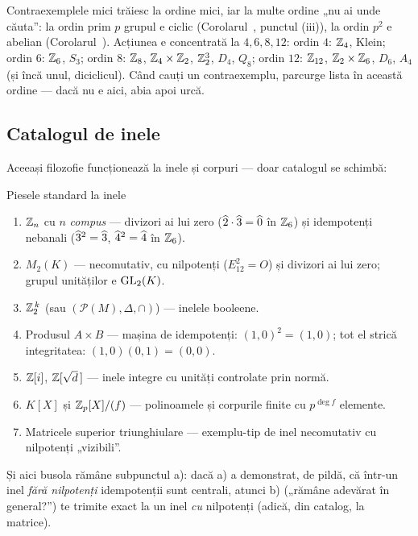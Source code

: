 \begin{obs}
Contraexemplele mici trăiesc la ordine mici, iar la multe ordine „nu ai unde căuta'': la ordin prim $p$ grupul e ciclic (Corolarul~, punctul (iii)), la ordin $p^2$ e abelian (Corolarul~). Acțiunea e concentrată la $4,6,8,12$: ordin $4$: $\mathbb{Z}_4$, Klein; ordin $6$: $\mathbb{Z}_6$, $S_3$; ordin $8$: $\mathbb{Z}_8$, $\mathbb{Z}_4\times\mathbb{Z}_2$, $\mathbb{Z}_2^3$, $D_4$, $Q_8$; ordin $12$: $\mathbb{Z}_{12}$, $\mathbb{Z}_2\times\mathbb{Z}_6$, $D_6$, $A_4$ (și încă unul, diciclicul). Când cauți un contraexemplu, parcurge lista în această ordine --- dacă nu e aici, abia apoi urcă.
\end{obs}

\subsection{Catalogul de inele}

Aceeași filozofie funcționează la inele și corpuri --- doar catalogul se schimbă:

\begin{tehbox}{Piesele standard la inele}
\begin{enumerate}[leftmargin=*, itemsep=1pt]
\item $\mathbb{Z}_n$ cu $n$ \emph{compus} --- divizori ai lui zero ($\widehat{2}\cdot\widehat{3}=\widehat{0}$ în $\mathbb{Z}_6$) și idempotenți nebanali ($\widehat{3}^2=\widehat{3}$, $\widehat{4}^2=\widehat{4}$ în $\mathbb{Z}_6$).
\item $M_2(K)$ --- necomutativ, cu nilpotenți ($E_{12}^2=O$) și divizori ai lui zero; grupul unităților e $\mathrm{GL}_2(K)$.
\item $\mathbb{Z}_2^{\,k}$ (sau $(\mathcal P(M),\Delta,\cap)$) --- inelele booleene.
\item Produsul $A\times B$ --- mașina de idempotenți: $(1,0)^2=(1,0)$; tot el strică integritatea: $(1,0)(0,1)=(0,0)$.
\item $\mathbb{Z}[i]$, $\mathbb{Z}[\sqrt d\,]$ --- inele integre cu unități controlate prin normă.
\item $K[X]$ și $\mathbb{Z}_p[X]/(f)$ --- polinoamele și corpurile finite cu $p^{\deg f}$ elemente.
\item Matricele superior triunghiulare --- exemplu-tip de inel necomutativ cu nilpotenți „vizibili''.
\end{enumerate}
\end{tehbox}

Și aici busola rămâne subpunctul a): dacă a) a demonstrat, de pildă, că într-un inel \emph{fără nilpotenți} idempotenții sunt centrali, atunci b) („rămâne adevărat în general?'') te trimite exact la un inel \emph{cu} nilpotenți (adică, din catalog, la matrice).


